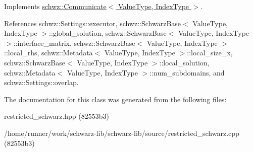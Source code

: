 Implements \hyperlink{classschwz_1_1Communicate_aa1332376dfc67f5384527be90df7cbea}{schwz\+::\+Communicate$<$ Value\+Type, Index\+Type $>$}.



References schwz\+::\+Settings\+::executor, schwz\+::\+Schwarz\+Base$<$ Value\+Type, Index\+Type $>$\+::global\+\_\+solution, schwz\+::\+Schwarz\+Base$<$ Value\+Type, Index\+Type $>$\+::interface\+\_\+matrix, schwz\+::\+Schwarz\+Base$<$ Value\+Type, Index\+Type $>$\+::local\+\_\+rhs, schwz\+::\+Metadata$<$ Value\+Type, Index\+Type $>$\+::local\+\_\+size\+\_\+x, schwz\+::\+Schwarz\+Base$<$ Value\+Type, Index\+Type $>$\+::local\+\_\+solution, schwz\+::\+Metadata$<$ Value\+Type, Index\+Type $>$\+::num\+\_\+subdomains, and schwz\+::\+Settings\+::overlap.



The documentation for this class was generated from the following files\+:\begin{DoxyCompactItemize}
\item 
restricted\+\_\+schwarz.\+hpp (82553b3)\item 
/home/runner/work/schwarz-\/lib/schwarz-\/lib/source/restricted\+\_\+schwarz.\+cpp (82553b3)\end{DoxyCompactItemize}

